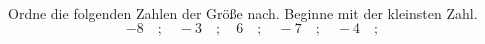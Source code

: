 \begin{aufgabe} ~ \\ 
Ordne die folgenden Zahlen der Größe nach. Beginne mit der kleinsten Zahl.\[-8\quad ; \quad-3\quad ; \quad6\quad ; \quad-7\quad ; \quad-4\quad ; \quad\]\underline{\hspace{12cm}}\end{aufgabe} 
